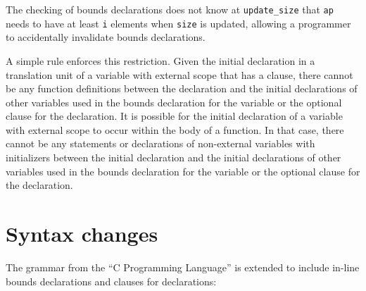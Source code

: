 The checking of bounds declarations does not know at
\texttt{update\_size} that \texttt{ap} needs to have at least \texttt{i}
elements when \texttt{size} is updated, allowing a programmer to accidentally
invalidate bounds declarations.

A simple rule enforces this restriction. Given the initial declaration
in a translation unit of a variable with external scope that has a
 clause, there cannot be any function definitions between
the declaration and the initial declarations of other variables used in
the bounds declaration for the variable or the optional  clause for the declaration.
It is possible for the initial declaration of
a variable with external scope to occur within the body of a function.
In that case, there cannot be any statements or declarations of
non-external variables with initializers between the initial declaration
and the initial declarations of other variables used in the
bounds declaration for the variable or the optional  clause for
the declaration.

\section{Syntax changes}
The grammar from the ``C Programming Language'' \cite{Ritchie1988} is extended to include
in-line bounds declarations and  clauses for declarations:

